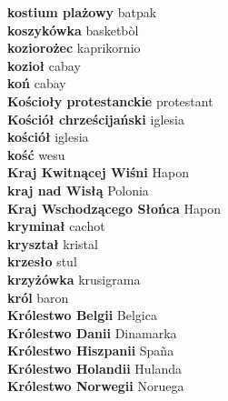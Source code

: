 \textbf{ kostium plażowy  } batpak \\
\textbf{ koszykówka  } basketbòl \\
\textbf{ koziorożec  } kaprikornio \\
\textbf{ kozioł  } cabay \\
\textbf{ koń  } cabay \\
\textbf{ Kościoły protestanckie  } protestant \\
\textbf{ Kościół chrześcijański  } iglesia \\
\textbf{ kościół  } iglesia \\
\textbf{ kość  } wesu \\
\textbf{ Kraj Kwitnącej Wiśni  } Hapon \\
\textbf{ kraj nad Wisłą  } Polonia \\
\textbf{ Kraj Wschodzącego Słońca  } Hapon \\
\textbf{ kryminał  } cachot \\
\textbf{ kryształ  } kristal \\
\textbf{ krzesło  } stul \\
\textbf{ krzyżówka  } krusigrama \\
\textbf{ król  } baron \\
\textbf{ Królestwo Belgii  } Belgica \\
\textbf{ Królestwo Danii  } Dinamarka \\
\textbf{ Królestwo Hiszpanii  } Spaña \\
\textbf{ Królestwo Holandii  } Hulanda \\
\textbf{ Królestwo Norwegii  } Noruega \\

